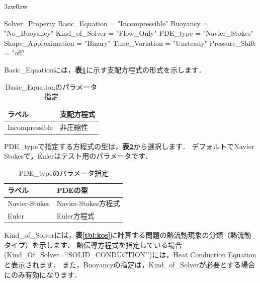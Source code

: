 \begin{indentation}{3zw}{0zw}

{\small
\begin{program}
  Solver_Property {
    Basic_Equation      = "Incompressible"
    Buoyancy            = "No_Buoyancy"
    Kind_of_Solver      = "Flow_Only"
    PDE_type            = "Navier_Stokes"
    Shape_Approximation = "Binary"
    Time_Variation      = "Unsteady"
    Pressure_Shift      = "off"
  }
\end{program}
}

Basic\_Equationには，\textbf{表\ref{tbl:basic_eq}}に示す支配方程式の形式を示します．

\begin{table}[htdp]
\caption{Basic\_Equationのパラメータ指定}
\begin{center}
\small
\begin{tabular}{ll} \toprule
ラベル & 支配方程式\\ \midrule
Incompressible & 非圧縮性\\ \bottomrule
\end{tabular}
\end{center}
\label{tbl:basic_eq}
\end{table}

PDE\_typeで指定する方程式の型は，\textbf{表\ref{tbl:PDE type}}から選択します．
デフォルトでNavier Stokesで，Eulerはテスト用のパラメータです．

\begin{table}[htdp]
\caption{PDE\_typeのパラメータ指定}
\begin{center}
\small
\begin{tabular}{ll} \toprule
ラベル & PDEの型\\ \midrule
Navier-Stokes & Navier-Stokes方程式\\
Euler & Euler方程式\\ \bottomrule
\end{tabular}
\end{center}
\label{tbl:PDE type}
\end{table}

Kind\_of\_Solverには，\textbf{表\ref{tbl:kos}}に計算する問題の熱流動現象の分類（熱流動タイプ）を示します．
熱伝導方程式を指定している場合(Kind\_Of\_Solver=\lq\lq SOLID\_CONDUCTION\rq\rq )には，Heat Conduction Equationと表示されます．
また，Buoyancyの指定は，Kind\_of\_Solverが必要とする場合にのみ有効になります．


\end{indentation}
